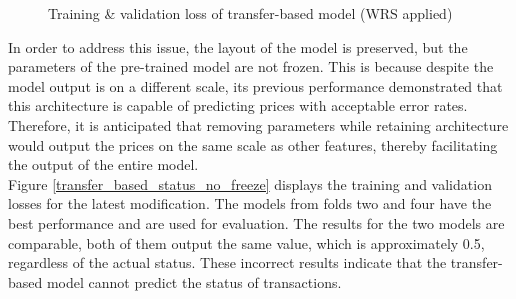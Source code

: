 \documentclass[12pt,twoside]{report}
\begin{document}
\begin{figure}[!htbp]
	\hfil
	\caption{Training \& validation loss of transfer-based model (WRS applied)}
	\label{transfer_based_status_WRS}
\end{figure}

In order to address this issue, the layout of the model is preserved, but the parameters of the pre-trained model are not frozen. This is because despite the model output is on a different scale, its previous performance demonstrated that this architecture is capable of predicting prices with acceptable error rates. Therefore, it is anticipated that removing parameters while retaining architecture would output the prices on the same scale as other features, thereby facilitating the output of the entire model. 
\\

Figure \ref{transfer_based_status_no_freeze} displays the training and validation losses for the latest modification. The models from folds two and four have the best performance and are used for evaluation. The results for the two models are comparable, both of them output the same value, which is approximately 0.5, regardless of the actual status. These incorrect results indicate that the transfer-based model cannot predict the status of transactions.  
\end{document}

